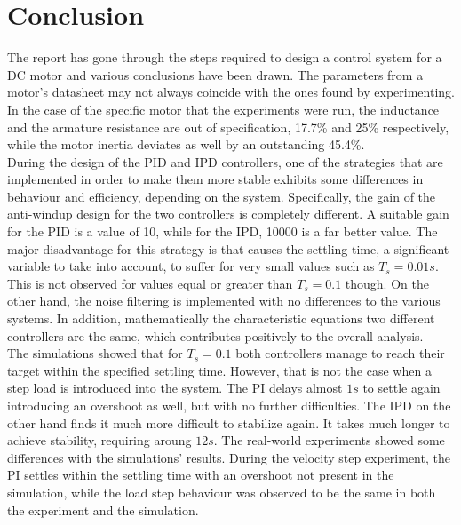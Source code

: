 \section{Conclusion}

The report has gone through the steps required to design a control system for a DC motor and various conclusions have been drawn. The parameters from a motor's datasheet may not always coincide with the ones found by experimenting. In the case of the specific motor that the experiments were run, the inductance and the armature resistance are out of specification, 17.7\% and 25\% respectively, while the motor inertia deviates as well by an outstanding 45.4\%. 
\\

During the design of the PID and IPD controllers, one of the strategies that are implemented in order to make them more stable exhibits some differences in behaviour and efficiency, depending on the system. Specifically, the gain of the anti-windup design for the two controllers is completely different. A suitable gain for the PID is a value of 10, while for the IPD, 10000 is a far better value. The major disadvantage for this strategy is that causes the settling time, a significant variable to take into account, to suffer for very small values such as $T_s=0.01s$. This is not observed for values equal or greater than $T_s=0.1$ though. On the other hand, the noise filtering is implemented with no differences to the various systems. In addition, mathematically the characteristic equations two different controllers are the same, which contributes positively to the overall analysis.
\\

The simulations showed that for $T_s=0.1$ both controllers manage to reach their target within the specified settling time. However, that is not the case when a step load is introduced into the system. The PI delays almost $1s$ to settle again introducing an overshoot as well, but with no further difficulties. The IPD on the other hand finds it much more difficult to stabilize again. It takes much longer to achieve stability, requiring aroung $12s$. The real-world experiments showed some differences with the simulations' results. During the velocity step experiment, the PI settles within the settling time with an overshoot not present in the simulation, while the load step behaviour was observed to be the same in both the experiment and the simulation.
